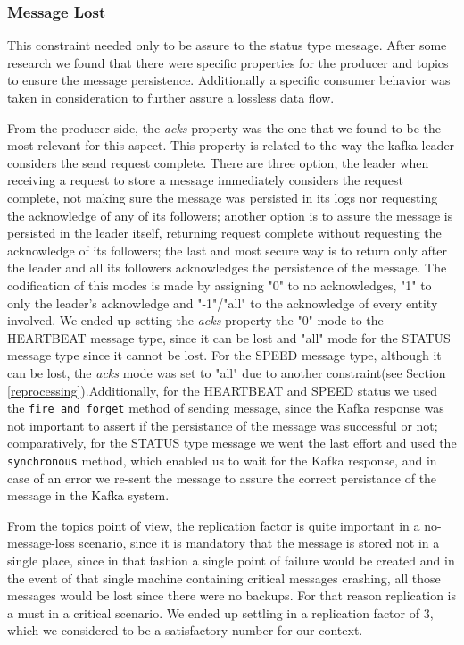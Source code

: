 \documentclass[12pt]{article}
\begin{document}
\subsubsection{Message Lost}\label{lost}
This constraint needed only to be assure to the status type message. After some research we found that there were specific properties for the producer and topics to ensure the message persistence. Additionally a specific consumer behavior was taken in consideration to further assure a lossless data flow.

From the producer side, the \textit{acks} property was the one that we found to be the most relevant for this aspect. This property is related to the way the kafka leader considers the send request complete. There are three option, the leader when receiving a request to store a message immediately considers the request complete, not making sure the message was persisted in its logs nor requesting the acknowledge of any of its followers; another option is to assure the message is persisted in the leader itself, returning request complete without requesting the acknowledge of its followers; the last and most secure way is to return only after the leader and all its followers acknowledges the persistence of the message. The codification of this modes is made by assigning "0" to no acknowledges, "1" to only the leader's acknowledge and "-1"/"all" to the acknowledge of every entity involved. We ended up setting the \textit{acks} property the "0" mode to the HEARTBEAT message type, since it can be lost and "all" mode for the STATUS message type since it cannot be lost. For the SPEED message type, although it can be lost, the \textit{acks} mode was set to "all" due to another constraint(see Section \ref{reprocessing}).Additionally, for the HEARTBEAT and SPEED status we used the \texttt{fire and forget} method of sending message, since the Kafka response was not important to assert if the persistance of the message was successful or not; comparatively, for the STATUS type message we went the last effort and used the \texttt{synchronous} method, which enabled us to wait for the Kafka response, and in case of an error we re-sent the message to assure the correct persistance of the message in the Kafka system.

From the topics point of view, the replication factor is quite important in a no-message-loss scenario, since it is mandatory that the message is stored not in a single place, since in that fashion a single point of failure would be created and in the event of that single machine containing critical messages crashing, all those messages would be lost since there were no backups. For that reason replication is a must in a critical scenario. We ended up settling in a replication factor of 3, which we considered to be a satisfactory number for our context.
\end{document}
